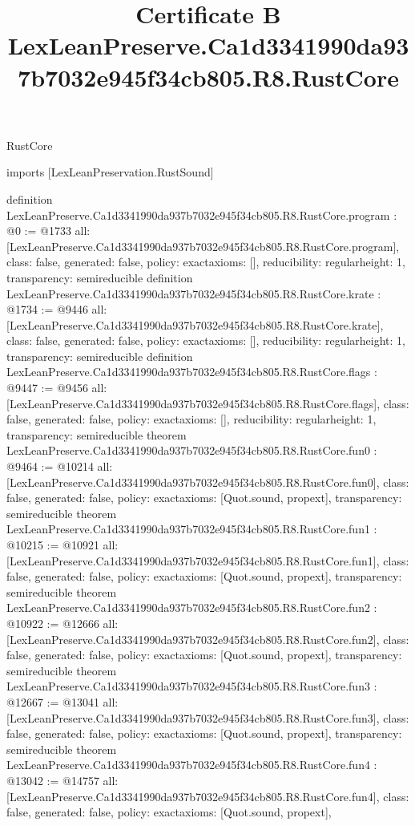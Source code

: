 \begin{lexlean}{RustCore}
\title{Certificate B LexLeanPreserve.Ca1d3341990da937b7032e945f34cb805.R8.RustCore}
\begin{coremodule}
imports [LexLeanPreservation.RustSound]

definition LexLeanPreserve.Ca1d3341990da937b7032e945f34cb805.R8.RustCore.program : @0 := @1733 {
  all: [LexLeanPreserve.Ca1d3341990da937b7032e945f34cb805.R8.RustCore.program],
  class: false,
  generated: false,
  policy: exact{axioms: []},
  reducibility: regular{height: 1},
  transparency: semireducible
}
definition LexLeanPreserve.Ca1d3341990da937b7032e945f34cb805.R8.RustCore.krate : @1734 := @9446 {
  all: [LexLeanPreserve.Ca1d3341990da937b7032e945f34cb805.R8.RustCore.krate],
  class: false,
  generated: false,
  policy: exact{axioms: []},
  reducibility: regular{height: 1},
  transparency: semireducible
}
definition LexLeanPreserve.Ca1d3341990da937b7032e945f34cb805.R8.RustCore.flags : @9447 := @9456 {
  all: [LexLeanPreserve.Ca1d3341990da937b7032e945f34cb805.R8.RustCore.flags],
  class: false,
  generated: false,
  policy: exact{axioms: []},
  reducibility: regular{height: 1},
  transparency: semireducible
}
theorem LexLeanPreserve.Ca1d3341990da937b7032e945f34cb805.R8.RustCore.fun0 : @9464 := @10214 {
  all: [LexLeanPreserve.Ca1d3341990da937b7032e945f34cb805.R8.RustCore.fun0],
  class: false,
  generated: false,
  policy: exact{axioms: [Quot.sound, propext]},
  transparency: semireducible
}
theorem LexLeanPreserve.Ca1d3341990da937b7032e945f34cb805.R8.RustCore.fun1 : @10215 := @10921 {
  all: [LexLeanPreserve.Ca1d3341990da937b7032e945f34cb805.R8.RustCore.fun1],
  class: false,
  generated: false,
  policy: exact{axioms: [Quot.sound, propext]},
  transparency: semireducible
}
theorem LexLeanPreserve.Ca1d3341990da937b7032e945f34cb805.R8.RustCore.fun2 : @10922 := @12666 {
  all: [LexLeanPreserve.Ca1d3341990da937b7032e945f34cb805.R8.RustCore.fun2],
  class: false,
  generated: false,
  policy: exact{axioms: [Quot.sound, propext]},
  transparency: semireducible
}
theorem LexLeanPreserve.Ca1d3341990da937b7032e945f34cb805.R8.RustCore.fun3 : @12667 := @13041 {
  all: [LexLeanPreserve.Ca1d3341990da937b7032e945f34cb805.R8.RustCore.fun3],
  class: false,
  generated: false,
  policy: exact{axioms: [Quot.sound, propext]},
  transparency: semireducible
}
theorem LexLeanPreserve.Ca1d3341990da937b7032e945f34cb805.R8.RustCore.fun4 : @13042 := @14757 {
  all: [LexLeanPreserve.Ca1d3341990da937b7032e945f34cb805.R8.RustCore.fun4],
  class: false,
  generated: false,
  policy: exact{axioms: [Quot.sound, propext]},
}
\end{coremodule}
\end{lexlean}
